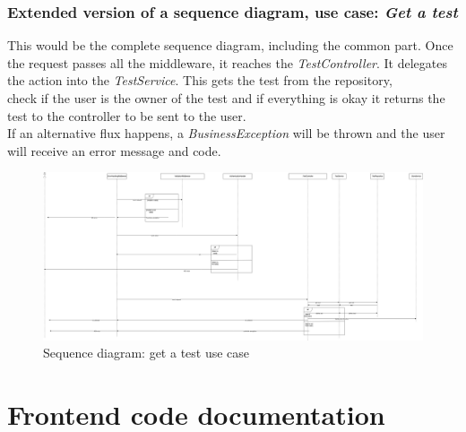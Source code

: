         \subsubsection{Extended version of a sequence diagram, use case: \textit{Get a test}}
            This would be the complete sequence diagram, including the common part. Once the request passes all the middleware, it reaches the \textit{TestController}. It delegates the action into the \textit{TestService}. This gets the test from the repository, \\ 
            check if the user is the owner of the test and if everything is okay it returns the test to the controller to be sent to the user. \\
            If an alternative flux happens, a \textit{BusinessException} will be thrown and the user will receive an error message and code.
                \newpage
                \begin{figure}[H]
                    \centering
                        \includegraphics[angle=90, width=\textwidth, height=\textheight]{assets/diagrams/getatest.png}
                    \caption{Sequence diagram: get a test use case}
                    \label{fig:implementation_getatest}
                \end{figure}

\newpage
\section{Frontend code documentation}
